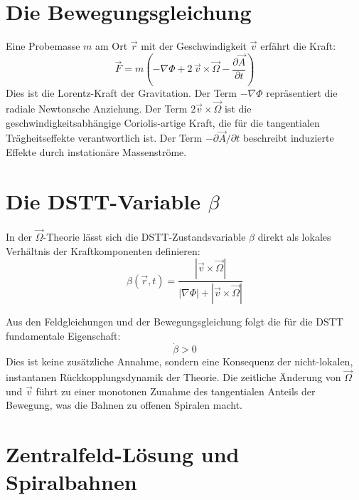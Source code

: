 \documentclass[12pt,a4paper]{article}
\begin{document}
\section{Die Bewegungsgleichung}

Eine Probemasse $m$ am Ort $\vec{r}$ mit der Geschwindigkeit $\vec{v}$ erfährt die Kraft:
\begin{equation}
\boxed{ \vec{F} = m \left( -\nabla \Phi + 2 \, \vec{v} \times \vec{\Omega} - \frac{\partial \vec{A}}{\partial t} \right) }
\end{equation}
Dies ist die Lorentz-Kraft der Gravitation. Der Term $-\nabla \Phi$ repräsentiert die radiale Newtonsche Anziehung. Der Term $2\vec{v} \times \vec{\Omega}$ ist die geschwindigkeitsabhängige Coriolis-artige Kraft, die für die tangentialen Trägheitseffekte verantwortlich ist. Der Term $-\partial \vec{A}/\partial t$ beschreibt induzierte Effekte durch instationäre Massenströme.

\section{Die DSTT-Variable $\beta$}

In der $\vec{\Omega}$-Theorie lässt sich die DSTT-Zustandsvariable $\beta$ direkt als lokales Verhältnis der Kraftkomponenten definieren:
\begin{equation}
\boxed{ \beta(\vec{r}, t) = \frac{ |\vec{v} \times \vec{\Omega}| }{ |\nabla \Phi| + |\vec{v} \times \vec{\Omega}| } }
\end{equation}

Aus den Feldgleichungen und der Bewegungsgleichung folgt die für die DSTT fundamentale Eigenschaft:
\begin{equation}
\boxed{ \dot{\beta} > 0 }
\end{equation}
Dies ist keine zusätzliche Annahme, sondern eine Konsequenz der nicht-lokalen, instantanen Rückkopplungsdynamik der Theorie. Die zeitliche Änderung von $\vec{\Omega}$ und $\vec{v}$ führt zu einer monotonen Zunahme des tangentialen Anteils der Bewegung, was die Bahnen zu offenen Spiralen macht.

\section{Zentralfeld-Lösung und Spiralbahnen}
\end{document}
